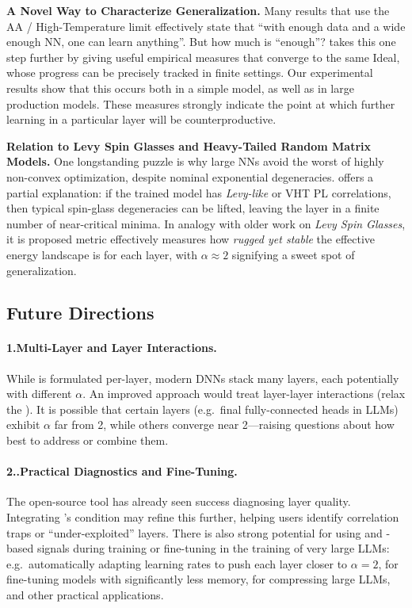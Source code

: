 \vspace{1em}
\noindent
\textbf{A Novel Way to Characterize Generalization.}
Many results that use the AA / High-Temperature limit effectively state that ``with enough data and a wide enough NN, one can learn anything''. But how much is ``enough''? \SETOL takes this one step further by giving useful empirical measures that converge to the same Ideal, whose progress can be precisely tracked in finite settings. Our experimental results show that this occurs both in a simple model, as well as in large production models. These measures strongly indicate the point at which further learning in a particular layer will be counterproductive.

\vspace{1em}
\noindent
\textbf{Relation to Levy Spin Glasses and Heavy-Tailed Random Matrix Models.}
One longstanding puzzle is why large NNs avoid the worst of highly non-convex optimization, despite nominal 
exponential degeneracies. \SETOL offers a partial explanation: if the trained model has \emph{Levy-like} or VHT
PL correlations, then typical spin-glass degeneracies can be lifted, leaving the layer in a finite number 
of near-critical minima. In analogy with older work on \emph{Levy Spin Glasses}\cite{Bouchaud1998}, it is
proposed \WW \ALPHA metric effectively measures how \emph{rugged yet stable} the
effective energy landscape is for each layer, with $\alpha\approx 2$ signifying a sweet spot of \Ideal generalization.

\subsection{Future Directions}

\paragraph{1.\quad Multi-Layer   \ERG and Layer Interactions.}
While \SETOL is formulated per-layer, modern DNNs stack many layers, each potentially with different $\alpha$. 
An improved approach would treat layer-layer interactions (relax the \IFA). It is possible 
that certain layers (e.g.\ final fully-connected heads in LLMs) exhibit $\alpha$ far from 2, while others 
converge near 2---raising questions about how best to address or combine them.

\paragraph{2..\quad Practical Diagnostics and Fine-Tuning.}
The open-source \WW tool has already seen success diagnosing layer quality. Integrating \SETOL’s 
\TRACELOG condition may refine this further, helping users identify correlation traps or “under-exploited” 
layers. There is also strong potential for using \ALPHA and \TRACELOG-based signals during training or 
fine-tuning in the training of very large LLMs: e.g.\ automatically adapting learning rates to push each layer closer to $\alpha=2$\cite{YTHx22_TR},
for fine-tuning models with significantly less memory\cite{Qing2024AlphaLoRA},
for compressing large LLMs\cite{alphapruning_NEURIPS2024}, and other practical applications.

